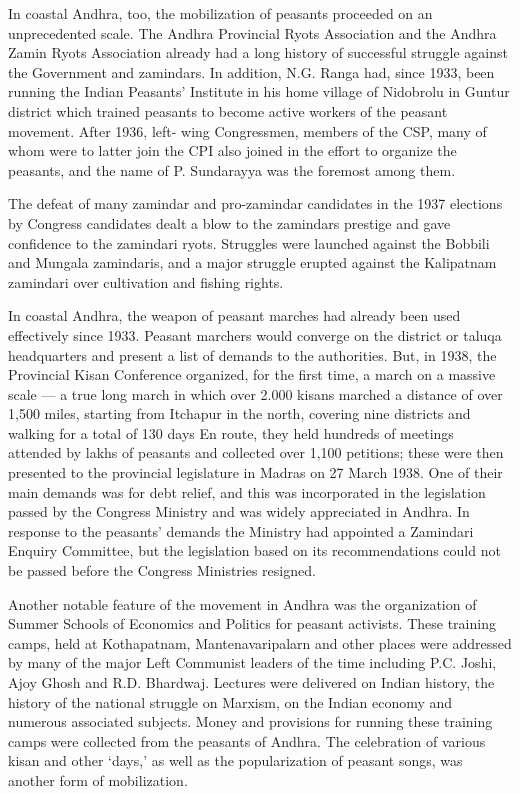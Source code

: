 In coastal Andhra, too, the mobilization of peasants proceeded on an unprecedented scale. The Andhra Provincial Ryots Association and the Andhra Zamin Ryots Association already had a long history of successful struggle against the Government and zamindars. In addition, N.G. Ranga had, since 1933, been running the Indian Peasants' Institute in his home village of Nidobrolu in Guntur district which trained peasants to become active workers of the peasant movement. After 1936, left- wing Congressmen, members of the CSP, many of whom were to latter join the CPI also joined in the effort to organize the peasants, and the name of P. Sundarayya was the foremost among them.

The defeat of many zamindar and pro-zamindar candidates in the 1937 elections by Congress candidates dealt a blow to the zamindars prestige and gave confidence to the zamindari ryots. Struggles were launched against the Bobbili and Mungala zamindaris, and a major struggle erupted against the Kalipatnam zamindari over cultivation and fishing rights.

In coastal Andhra, the weapon of peasant marches had already been used effectively since 1933. Peasant marchers would converge on the district or taluqa headquarters and present a list of demands to the authorities. But, in 1938, the Provincial Kisan Conference organized, for the first time, a march on a massive scale --- a true long march in which over 2.000 kisans marched a distance of over 1,500 miles, starting from Itchapur in the north, covering nine districts and walking for a total of 130 days En route, they held hundreds of meetings attended by lakhs of peasants and collected over 1,100 petitions; these were then presented to the provincial legislature in Madras on 27 March 1938. One of their main demands was for debt relief, and this was incorporated in the legislation passed by the Congress Ministry and was widely appreciated in Andhra. In response to the peasants' demands the Ministry had appointed a Zamindari Enquiry Committee, but the legislation based on its recommendations could not be passed before the Congress Ministries resigned.

Another notable feature of the movement in Andhra was the organization of Summer Schools of Economics and Politics for peasant activists. These training camps, held at Kothapatnam, Mantenavaripalarn and other places were addressed by many of the major Left Communist leaders of the time including P.C. Joshi, Ajoy Ghosh and R.D. Bhardwaj. Lectures were delivered on Indian history, the history of the national struggle on Marxism, on the Indian economy and numerous associated subjects. Money and provisions for running these training camps were collected from the peasants of Andhra. The celebration of various kisan and other `days,' as well as the popularization of peasant songs, was another form of mobilization.

